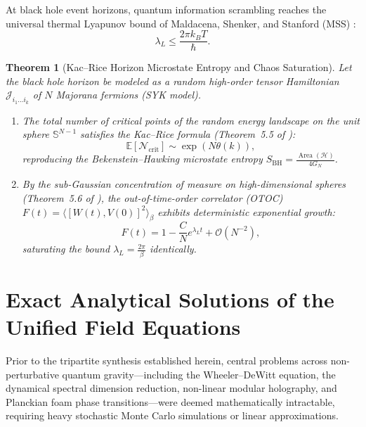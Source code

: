 \documentclass[11pt,a4paper,reqno]{amsart}
\newtheorem{theorem}{Theorem}[section]
\theoremstyle{definition}
\numberwithin{equation}{section}
\providecommand{\Sph}{\mathbb{S}}
\providecommand{\Area}{\operatorname{Area}}
\providecommand{\Sph}{\mathbb{S}}
\providecommand{\Area}{\mathrm{Area}}
\begin{document}
At black hole event horizons, quantum information scrambling reaches the universal thermal Lyapunov bound of Maldacena, Shenker, and Stanford (MSS) \cite{maldacena2016bound}:
\begin{equation}
    \label{eq:mss_lyapunov_bound}
    \lambda_L \le \frac{2\pi k_B T}{\hbar}.
\end{equation}

\begin{theorem}[Kac--Rice Horizon Microstate Entropy and Chaos Saturation]
\label{thm:horizon_morse_saturation}
Let the black hole horizon be modeled as a random high-order tensor Hamiltonian $\mathcal{J}_{i_1 \dots i_k}$ of $N$ Majorana fermions (SYK model).
\begin{enumerate}[label=(\roman*)]
    \item The total number of critical points of the random energy landscape on the unit sphere $\Sph^{N-1}$ satisfies the Kac--Rice formula (Theorem~5.5 of \cite{silvafilho2026functional}):
    \begin{equation}
        \mathbb{E}[\mathcal{N}_{\mathrm{crit}}] \sim \exp\left( N \theta(k) \right),
    \end{equation}
    reproducing the Bekenstein--Hawking microstate entropy $S_{\mathrm{BH}} = \frac{\Area(\mathcal{H})}{4 G_N}$.
    \item By the sub-Gaussian concentration of measure on high-dimensional spheres (Theorem~5.6 of \cite{silvafilho2026functional}), the out-of-time-order correlator (OTOC) $F(t) = \langle [W(t), V(0)]^2 \rangle_\beta$ exhibits deterministic exponential growth:
    \begin{equation}
        F(t) = 1 - \frac{C}{N} e^{\lambda_L t} + \mathcal{O}(N^{-2}),
    \end{equation}
    saturating the bound $\lambda_L = \frac{2\pi}{\beta}$ identically.
\end{enumerate}
\end{theorem}

\section{Exact Analytical Solutions of the Unified Field Equations}
\label{sec:analytical_solutions}

Prior to the tripartite synthesis established herein, central problems across non-perturbative quantum gravity—including the Wheeler--DeWitt equation, the dynamical spectral dimension reduction, non-linear modular holography, and Planckian foam phase transitions—were deemed mathematically intractable, requiring heavy stochastic Monte Carlo simulations or linear approximations. 
\end{document}
